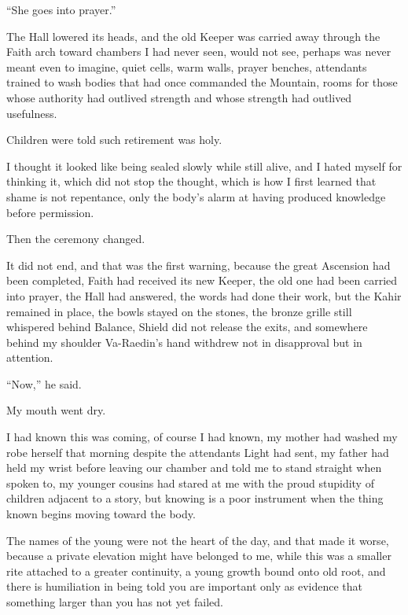 “She goes into prayer.”\par

The Hall lowered its heads, and the old Keeper was carried away through the Faith arch toward 
chambers I had never seen, would not see, perhaps was never meant even to imagine, quiet cells, 
warm walls, prayer benches, attendants trained to wash bodies that had once commanded the Mountain, 
rooms for those whose authority had outlived strength and whose strength had outlived usefulness.\par

Children were told such retirement was holy.\par

I thought it looked like being sealed slowly while still alive, and I hated myself for thinking 
it, which did not stop the thought, which is how I first learned that shame is not repentance, 
only the body’s alarm at having produced knowledge before permission.\par


Then the ceremony changed.\par

It did not end, and that was the first warning, because the great Ascension had been completed, 
Faith had received its new Keeper, the old one had been carried into prayer, the Hall had answered, 
the words had done their work, but the Kahir remained in place, the bowls stayed on the stones, 
the bronze grille still whispered behind Balance, Shield did not release the exits, and somewhere 
behind my shoulder Va-Raedin’s hand withdrew not in disapproval but in attention.\par

“Now,” he said.\par

My mouth went dry.\par

I had known this was coming, of course I had known, my mother had washed my robe herself that 
morning despite the attendants Light had sent, my father had held my wrist before leaving our 
chamber and told me to stand straight when spoken to, my younger cousins had stared at me with 
the proud stupidity of children adjacent to a story, but knowing is a poor instrument when the 
thing known begins moving toward the body.\par

The names of the young were not the heart of the day, and that made it worse, because a private 
elevation might have belonged to me, while this was a smaller rite attached to a greater continuity, 
a young growth bound onto old root, and there is humiliation in being told you are important only 
as evidence that something larger than you has not yet failed.\par

